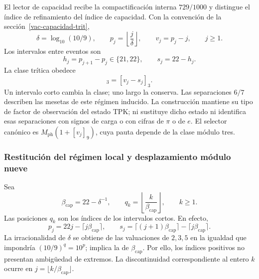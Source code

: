 El lector de capacidad recibe la compactificación interna $729/1000$ y
distingue el índice de refinamiento del índice de capacidad. Con la
convención de la sección~\ref{vac-capacidad-trit},
\begin{equation}
 \delta=\log_{10}(10/9),\qquad
 p_j=\left\lfloor\frac{j}{\delta}\right\rfloor,\qquad
 v_j=p_j-j,\qquad j\geq1.
 \label{md:restop:capacidad}
\end{equation}
Los intervalos entre eventos son
\begin{equation}
 h_j=p_{j+1}-p_j\in\{21,22\},\qquad
 s_j=22-h_j.
 \label{md:restop:intervalos}
\end{equation}
La clase trítica obedece
\begin{equation}
 [v_{j+1}]_3=[v_j-s_j]_3.
 \label{md:restop:clase-tritica}
\end{equation}
Un intervalo corto cambia la clase; uno largo la conserva.
Las separaciones $6/7$ describen las mesetas de este régimen inducido.
La construcción mantiene su tipo de factor de observación del estado TPK;
ni sustituye dicho estado ni identifica esas separaciones con signos de
carga o con cifras de $\pi$ o de $e$.
El selector canónico es
$M_{\mathrm{ph}}(1+[v_j]_9)$, cuya pauta depende de la clase módulo tres.

\subsubsection{Restitución del régimen local y desplazamiento módulo nueve}
\label{md:restop:consecuencia-capacidad}

Sea
\begin{equation}
 \beta_{\mathrm{cap}}=22-\delta^{-1},\qquad
 q_k=\left\lfloor\frac{k}{\beta_{\mathrm{cap}}}\right\rfloor,\qquad k\geq1.
 \label{md:restop:pendiente-inducida}
\end{equation}
Las posiciones $q_k$ son los índices de los intervalos cortos. En efecto,
\begin{equation}
 p_j=22j-\lceil j\beta_{\mathrm{cap}}\rceil,\qquad
 s_j=\lceil(j+1)\beta_{\mathrm{cap}}\rceil
     -\lceil j\beta_{\mathrm{cap}}\rceil.
 \label{md:restop:eventos-cortos}
\end{equation}
La irracionalidad de $\delta$ se obtiene de las valuaciones de $2,3,5$
en la igualdad que impondría $(10/9)^q=10^p$; implica la de
$\beta_{\mathrm{cap}}$. Por ello, los índices positivos no presentan
ambigüedad de extremos. La discontinuidad correspondiente al entero $k$
ocurre en $j=\lfloor k/\beta_{\mathrm{cap}}\rfloor$.

